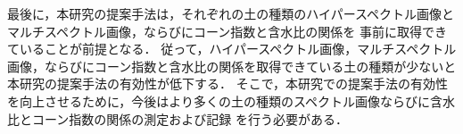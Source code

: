 最後に，本研究の提案手法は，それぞれの土の種類のハイパースペクトル画像とマルチスペクトル画像，ならびにコーン指数と含水比の関係を
事前に取得できていることが前提となる．
従って，ハイパースペクトル画像，マルチスペクトル画像，ならびにコーン指数と含水比の関係を取得できている土の種類が少ないと
本研究の提案手法の有効性が低下する．
そこで，本研究での提案手法の有効性を向上させるために，今後はより多くの土の種類のスペクトル画像ならびに含水比とコーン指数の関係の測定および記録
を行う必要がある．

\newpage

